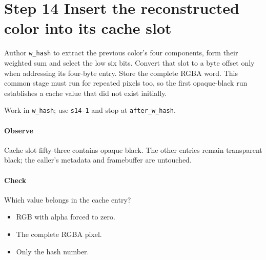 \section{Step 14 Insert the reconstructed color into its cache slot}\label{qoi-s14}
Author \texttt{w\_hash} to extract the previous color’s four components, form their weighted sum and select the low six bits. Convert that slot to a byte offset only when addressing its four-byte entry. Store the complete RGBA word. This common stage must run for repeated pixels too, so the first opaque-black run establishes a cache value that did not exist initially.

Work in \texttt{w\_hash}; use \texttt{s14-1} and stop at \texttt{after\_w\_hash}.

\paragraph{Observe} Cache slot fifty-three contains opaque black. The other entries remain transparent black; the caller’s metadata and framebuffer are untouched.

\paragraph{Check} Which value belongs in the cache entry?
\begin{itemize}
\item[A.] RGB with alpha forced to zero.
\item[B.] The complete RGBA pixel.
\item[C.] Only the hash number.
\end{itemize}
